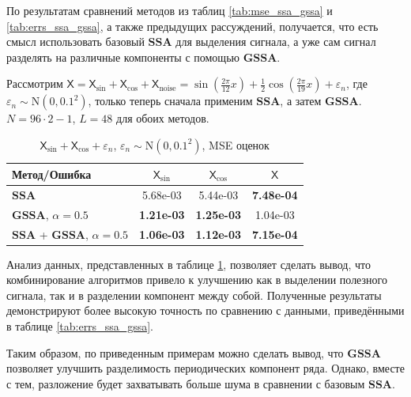 \documentclass[a4paper, 11pt]{article}
\newcommand{\SSA}{\textbf{SSA}}
\newcommand{\GSSA}{\textbf{GSSA}}
\newcommand{\TS}{\mathsf{X}}
\begin{document}
По результатам сравнений методов из таблиц \ref{tab:mse_ssa_gssa} и \ref{tab:errs_ssa_gssa}, а также предыдущих рассуждений, получается, что есть смысл использовать базовый $\SSA$ для выделения сигнала, а уже сам сигнал разделять на различные компоненты с помощью $\GSSA$. 

Рассмотрим $\TS = \TS_{\sin} + \TS_{\cos} + \TS_{\mathrm{noise}} =
 \sin\left(\frac{2\pi}{12}x\right) +
  \frac{1}{2}\cos\left(\frac{2\pi}{19}x\right)+
   \varepsilon_n$, 
   где $\varepsilon_n \sim \mathrm N(0, 0.1^2)$, только теперь сначала применим $\SSA$, а затем $\GSSA$. 
   $N = 96 \cdot 2 - 1$, $L = 48$ для обоих методов.

   \begin{table}[H]
	\centering
	\caption{$\TS_{\sin} + \TS_{\cos}+
			\varepsilon_n$, $\varepsilon_n \sim \mathrm N(0, 0.1^2)$, MSE оценок }
	\label{tab:errs_ssa_gssa_unite}
	\begin{tabular}{l|ccc}
		\hline
		Метод/Ошибка                     & $\TS_{\sin}$      & $\TS_{\cos}$      & $\TS$             \\
		\hline
		$\SSA$                           & 5.68e-03          & 5.44e-03          & \textbf{7.48e-04} \\
		$\GSSA$, $\alpha = 0.5$          & \textbf{1.21e-03} & \textbf{1.25e-03} & 1.04e-03          \\
		\hline
		$\SSA$ + $\GSSA$, $\alpha = 0.5$ & \textbf{1.06e-03} & \textbf{1.12e-03} & \textbf{7.15e-04} \\
		\hline
	\end{tabular}
\end{table}

Анализ данных, представленных в таблице \ref{tab:errs_ssa_gssa_unite}, позволяет сделать вывод, что комбинирование алгоритмов привело к улучшению как в выделении полезного сигнала, так и в разделении компонент между собой. Полученные результаты демонстрируют более высокую точность по сравнению с данными, приведёнными в таблице \ref{tab:errs_ssa_gssa}.


Таким образом, по приведенным примерам можно сделать вывод, что $\GSSA$ позволяет улучшить разделимость периодических компонент ряда. Однако, вместе с тем, разложение будет захватывать больше шума в сравнении с базовым $\SSA$.
\end{document}
